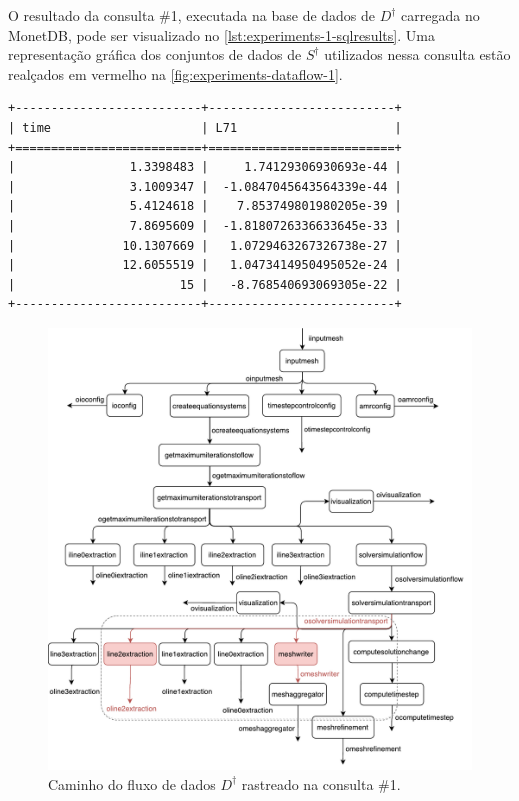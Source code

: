 O resultado da consulta \#1, executada na base de dados de \(D^{\dagger}\) carregada no MonetDB, pode ser visualizado no \autoref{lst:experiments-1-sqlresults}. Uma representação gráfica dos conjuntos de dados de \(S^{\dagger}\) utilizados nessa consulta estão realçados em vermelho na \autoref{fig:experiments-dataflow-1}.

\begin{lstlisting}[language=sqlresults,label={lst:experiments-1-sqlresults},caption={[Resultados da consulta \#1.]Resultados da consulta \#1 (7 tuplas, tempo médio: 4,346~ms).}]
+--------------------------+--------------------------+
| time                     | L71                      |
+==========================+==========================+
|                1.3398483 |     1.74129306930693e-44 |
|                3.1009347 |  -1.0847045643564339e-44 |
|                5.4124618 |    7.853749801980205e-39 |
|                7.8695609 |  -1.8180726336633645e-33 |
|               10.1307669 |   1.0729463267326738e-27 |
|               12.6055519 |   1.0473414950495052e-24 |
|                       15 |   -8.768540693069305e-22 |
+--------------------------+--------------------------+
\end{lstlisting}

\begin{figure}[htb]
    \centering
    \includegraphics[width=\textwidth]{img/experiments-dataflow-1}
    \caption[Caminho do fluxo de dados \(D^{\dagger}\) rastreado na consulta \#1]{Caminho do fluxo de dados \(D^{\dagger}\) rastreado na consulta \#1.}%
    \label{fig:experiments-dataflow-1}
\end{figure}


